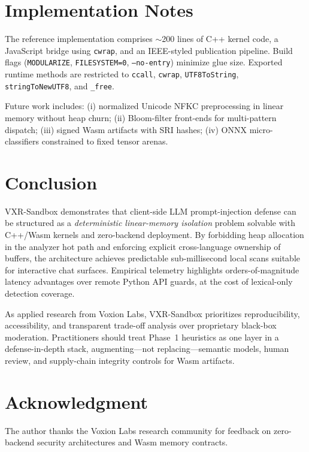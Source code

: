 \documentclass[conference]{IEEEtran}
\begin{document}
\section{Implementation Notes}
\label{sec:impl}

The reference implementation comprises $\sim$200 lines of C++ kernel code, a JavaScript bridge using \texttt{cwrap}, and an IEEE-styled publication pipeline. Build flags (\texttt{MODULARIZE}, \texttt{FILESYSTEM=0}, \texttt{--no-entry}) minimize glue size. Exported runtime methods are restricted to \texttt{ccall}, \texttt{cwrap}, \texttt{UTF8ToString}, \texttt{stringToNewUTF8}, and \texttt{\_free}.

Future work includes: (i) normalized Unicode NFKC preprocessing in linear memory without heap churn; (ii) Bloom-filter front-ends for multi-pattern dispatch; (iii) signed Wasm artifacts with SRI hashes; (iv) ONNX micro-classifiers constrained to fixed tensor arenas.

\section{Conclusion}
\label{sec:conclusion}

VXR-Sandbox demonstrates that client-side LLM prompt-injection defense can be structured as a \emph{deterministic linear-memory isolation} problem solvable with C++/Wasm kernels and zero-backend deployment. By forbidding heap allocation in the analyzer hot path and enforcing explicit cross-language ownership of buffers, the architecture achieves predictable sub-millisecond local scans suitable for interactive chat surfaces. Empirical telemetry highlights orders-of-magnitude latency advantages over remote Python API guards, at the cost of lexical-only detection coverage.

As applied research from Voxion Labs, VXR-Sandbox prioritizes reproducibility, accessibility, and transparent trade-off analysis over proprietary black-box moderation. Practitioners should treat Phase~1 heuristics as one layer in a defense-in-depth stack, augmenting---not replacing---semantic models, human review, and supply-chain integrity controls for Wasm artifacts.

\section*{Acknowledgment}

The author thanks the Voxion Labs research community for feedback on zero-backend security architectures and Wasm memory contracts.
\end{document}

